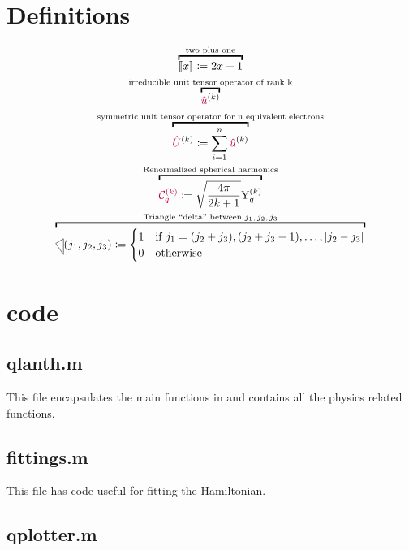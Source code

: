 \documentclass[11pt, twoside,openright]{article}
\begin{document}
\section{Definitions}\label{section:definitions} 

\begin{gather} 
    \overbracket{\tpobraket{x} \DEF 2x+1}^{\text{two plus one}} \\
    \overbracket{\op{u}^{(k)}}^{\text{irreducible unit tensor operator of rank k}} \\ 
    \overbracket{\op{U}^{(k)} \DEF \sum_{i=1}^{n} \op{u}^{(k)} }^{\text{symmetric unit tensor operator for n equivalent electrons}} \\
    \overbracket{\Ckq{k}{q} \DEF \sqrt{\frac{4\pi}{2k+1}} \Ykq}^{\text{Renormalized spherical harmonics}} \\
    \overbracket{\tricondition{j_1,j_2,j_3} \DEF
    \begin{cases} 
        1 & \text{if } j_1 = (j_2 + j_3), (j_2 + j_3 - 1), \ldots, |j_2-j_3|\\
        0 & \text{otherwise}
        \end{cases}}^{\text{Triangle ``delta'' between $j_1,j_2,j_3$}} 
\end{gather}

\newpage

\section{code}\label{section:code}

\subsection{qlanth.m}

This file encapsulates the main functions in \qlanth and contains all the physics related functions.



\subsection{fittings.m}\label{sub:fittings.m}

This file has code useful for fitting the Hamiltonian.



\subsection{qplotter.m}\label{sub:qplotter.m}
\end{document}
